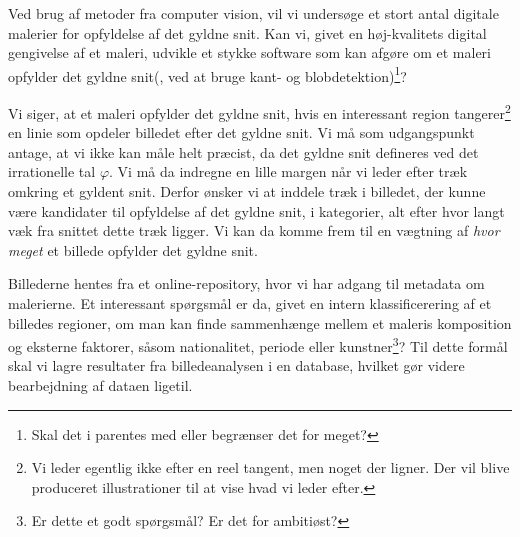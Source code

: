 Ved brug af metoder fra computer vision, vil vi undersøge et stort antal
digitale malerier for opfyldelse af det gyldne snit. Kan vi, givet en
høj-kvalitets digital gengivelse af et maleri, udvikle et stykke software som
kan afgøre om et maleri opfylder det gyldne snit(, ved at bruge kant- og
blobdetektion)\footnote{Skal det i parentes med eller begrænser det for
meget?}?

Vi siger, at et maleri opfylder det gyldne snit, hvis en interessant region
tangerer\footnote{Vi leder egentlig ikke efter en reel tangent, men noget der
ligner. Der vil blive produceret illustrationer til at vise hvad vi leder
efter.} en linie som opdeler billedet efter det gyldne snit. Vi må som
udgangspunkt antage, at vi ikke kan måle helt præcist, da det gyldne snit
defineres ved det irrationelle tal $\varphi$. Vi må da indregne en lille margen
når vi leder efter træk omkring et gyldent snit.  Derfor ønsker vi at inddele
træk i billedet, der kunne være kandidater til opfyldelse af det gyldne snit, i
kategorier, alt efter hvor langt væk fra snittet dette træk ligger. Vi kan da
komme frem til en vægtning af \emph{hvor meget} et billede opfylder det gyldne
snit.

Billederne hentes fra et online-repository, hvor vi har adgang til metadata om
malerierne. Et interessant spørgsmål er da, givet en intern klassificerering af
et billedes regioner, om man kan finde sammenhænge mellem et maleris
komposition og eksterne faktorer, såsom nationalitet, periode eller
kunstner\footnote{Er dette et godt spørgsmål? Er det for ambitiøst?}?  Til
dette formål skal vi lagre resultater fra billedeanalysen i en database,
hvilket gør videre bearbejdning af dataen ligetil.
